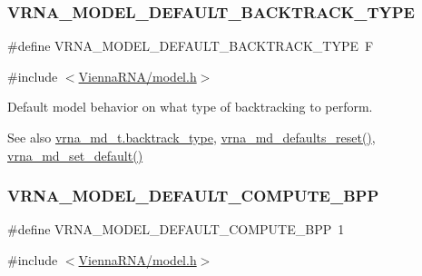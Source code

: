 \subsubsection{\texorpdfstring{V\+R\+N\+A\+\_\+\+M\+O\+D\+E\+L\+\_\+\+D\+E\+F\+A\+U\+L\+T\+\_\+\+B\+A\+C\+K\+T\+R\+A\+C\+K\+\_\+\+T\+Y\+PE}{VRNA\_MODEL\_DEFAULT\_BACKTRACK\_TYPE}}
{\footnotesize\ttfamily \#define V\+R\+N\+A\+\_\+\+M\+O\+D\+E\+L\+\_\+\+D\+E\+F\+A\+U\+L\+T\+\_\+\+B\+A\+C\+K\+T\+R\+A\+C\+K\+\_\+\+T\+Y\+PE~\textquotesingle{}F\textquotesingle{}}



{\ttfamily \#include $<$\hyperlink{model_8h}{Vienna\+R\+N\+A/model.\+h}$>$}



Default model behavior on what type of backtracking to perform. 

\begin{DoxySeeAlso}{See also}
\hyperlink{group__model__details_abb265da25121d22ed11c8435861f0e53}{vrna\+\_\+md\+\_\+t.\+backtrack\+\_\+type}, \hyperlink{group__model__details_ga70834424cf804d149937de89f80ceb45}{vrna\+\_\+md\+\_\+defaults\+\_\+reset()}, \hyperlink{group__model__details_ga8ac6ff84936282436f822644bf841f66}{vrna\+\_\+md\+\_\+set\+\_\+default()} 
\end{DoxySeeAlso}
\mbox{\label{group__model__details_ga1d6cd5051940b126c248147c011bac6c}} 
\subsubsection{\texorpdfstring{V\+R\+N\+A\+\_\+\+M\+O\+D\+E\+L\+\_\+\+D\+E\+F\+A\+U\+L\+T\+\_\+\+C\+O\+M\+P\+U\+T\+E\+\_\+\+B\+PP}{VRNA\_MODEL\_DEFAULT\_COMPUTE\_BPP}}
{\footnotesize\ttfamily \#define V\+R\+N\+A\+\_\+\+M\+O\+D\+E\+L\+\_\+\+D\+E\+F\+A\+U\+L\+T\+\_\+\+C\+O\+M\+P\+U\+T\+E\+\_\+\+B\+PP~1}



{\ttfamily \#include $<$\hyperlink{model_8h}{Vienna\+R\+N\+A/model.\+h}$>$}



